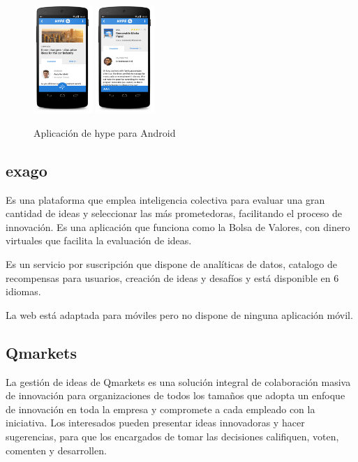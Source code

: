 \begin{figure}[!h]
	\begin{center}
		\includegraphics[width=0.2\textwidth]{./img/competencia/hype/1.png}
		\includegraphics[width=0.2\textwidth]{./img/competencia/hype/2.png}
		\caption{Aplicación de hype para Android}
		\label{fig:hype}
	\end{center}
\end{figure}

\subsection{exago}

Es una plataforma que emplea inteligencia colectiva para evaluar una 
gran cantidad de ideas y seleccionar las más prometedoras, facilitando 
el proceso de innovación. Es una aplicación que funciona como la Bolsa de Valores, con dinero
virtuales que facilita la evaluación de ideas. 

Es un servicio por suscripción que dispone 
de analíticas de datos, catalogo de recompensas para usuarios, creación de ideas y desafíos y 
está disponible en  6 idiomas.

La web está adaptada para móviles pero no dispone de ninguna aplicación móvil.

\subsection{Qmarkets}

La gestión de ideas de Qmarkets es una solución integral de colaboración masiva de innovación para
 organizaciones de todos los tamaños que adopta un enfoque de innovación en toda la empresa y compromete a cada empleado con la iniciativa. Los interesados pueden presentar ideas innovadoras y hacer sugerencias, 
 para que los encargados de tomar las decisiones califiquen, voten, comenten y desarrollen. 

